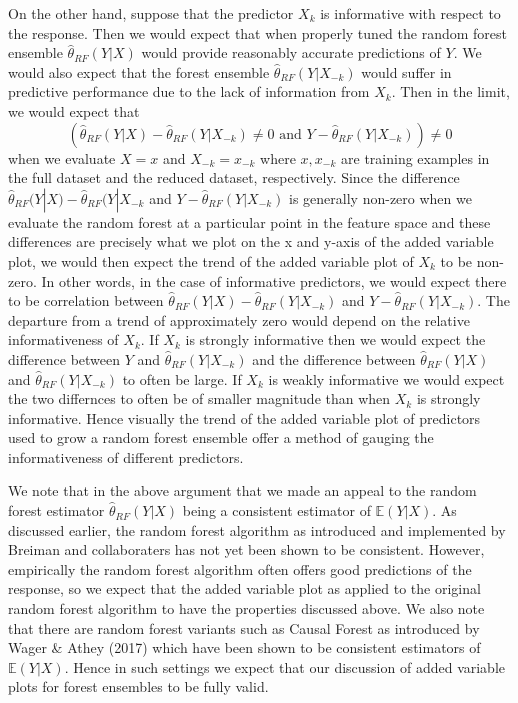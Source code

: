 \documentclass[12pt,twoside]{reedthesis}
\theoremstyle{definition}
\theoremstyle{definition}
\theoremstyle{definition}
\theoremstyle{remark}
\begin{document}
On the other hand, suppose that the predictor \(X_k\) is informative
with respect to the response. Then we would expect that when properly
tuned the random forest ensemble \(\hat{\theta}_{RF}(Y|X)\) would
provide reasonably accurate predictions of \(Y\). We would also expect
that the forest ensemble \(\hat{\theta}_{RF}(Y|X_{-k})\) would suffer in
predictive performance due to the lack of information from \(X_k\). Then
in the limit, we would expect that
\[(\hat{\theta}_{RF}(Y|X)-\hat{\theta}_{RF}(Y|X_{-k})\neq 0 \text{ and } Y-\hat{\theta}_{RF}(Y|X_{-k}))\neq 0\]
when we evaluate \(X=x\) and \(X_{-k}=x_{-k}\) where \(x,x_{-k}\) are
training examples in the full dataset and the reduced dataset,
respectively. Since the difference
\(\hat{\theta}_{RF}(Y|X)-\hat{\theta}_{RF}(Y|X_{-k}\) and
\(Y-\hat{\theta}_{RF}(Y|X_{-k})\) is generally non-zero when we evaluate
the random forest at a particular point in the feature space and these
differences are precisely what we plot on the x and y-axis of the added
variable plot, we would then expect the trend of the added variable plot
of \(X_k\) to be non-zero. In other words, in the case of informative
predictors, we would expect there to be correlation between
\(\hat{\theta}_{RF}(Y|X)-\hat{\theta}_{RF}(Y|X_{-k})\) and
\(Y-\hat{\theta}_{RF}(Y|X_{-k})\). The departure from a trend of
approximately zero would depend on the relative informativeness of
\(X_k\). If \(X_k\) is strongly informative then we would expect the
difference between \(Y\) and \(\hat{\theta}_{RF}(Y|X_{-k})\) and the
difference between \(\hat{\theta}_{RF}(Y|X)\) and
\(\hat{\theta}_{RF}(Y|X_{-k})\) to often be large. If \(X_k\) is weakly
informative we would expect the two differnces to often be of smaller
magnitude than when \(X_k\) is strongly informative. Hence visually the
trend of the added variable plot of predictors used to grow a random
forest ensemble offer a method of gauging the informativeness of
different predictors. \par

We note that in the above argument that we made an appeal to the random
forest estimator \(\hat{\theta}_{RF}(Y|X)\) being a consistent estimator
of \(\mathbb{E}(Y|X)\). As discussed earlier, the random forest
algorithm as introduced and implemented by Breiman and collaboraters has
not yet been shown to be consistent. However, empirically the random
forest algorithm often offers good predictions of the response, so we
expect that the added variable plot as applied to the original random
forest algorithm to have the properties discussed above. We also note
that there are random forest variants such as Causal Forest as
introduced by Wager \& Athey (2017) which have been shown to be
consistent estimators of \(\mathbb{E}(Y|X)\). Hence in such settings we
expect that our discussion of added variable plots for forest ensembles
to be fully valid. \par
\end{document}
